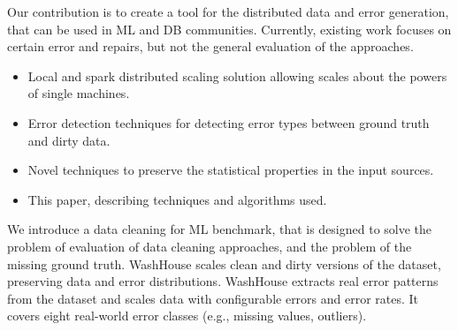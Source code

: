 Our contribution is to create a tool for the distributed data and error generation, that can be used in ML and DB communities. 
Currently, existing work focuses on certain error and repairs, but not the general evaluation of the approaches.

\begin{itemize}
    \item Local and spark distributed scaling solution allowing scales about the powers of single machines.
    \item Error detection techniques for detecting error types between ground truth and dirty data.
    \item Novel techniques to preserve the statistical properties in the input sources.
    \item This paper, describing techniques and algorithms used.
\end{itemize}

We introduce a data cleaning for ML benchmark, that is designed to solve the problem of evaluation of data cleaning approaches, and the problem of the missing ground truth.
WashHouse scales clean and dirty versions of the dataset, preserving data and error distributions. 
WashHouse extracts real error patterns from the dataset and scales data with configurable errors and error rates. 
It covers eight real-world error classes (e.g., missing values, outliers).


